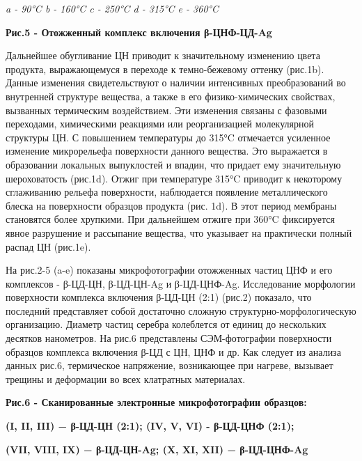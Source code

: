 \emph{a - 90°C b - 160°C c - 250°C d - 315°C e - 360°C}

{\bfseries Рис.5 - Отожженный комплекс включения β-ЦНФ-ЦД-Ag}

Дальнейшее обугливание ЦН приводит к значительному изменению цвета
продукта, выражающемуся в переходе к темно-бежевому оттенку (рис.1b).
Данные изменения свидетельствуют о наличии интенсивных преобразований во
внутренней структуре вещества, а также в его физико-химических
свойствах, вызванных термическим воздействием. Эти изменения связаны с
фазовыми переходами, химическими реакциями или реорганизацией
молекулярной структуры ЦН. С повышением температуры до 315°C отмечается
усиленное изменение микрорельефа поверхности данного вещества. Это
выражается в образовании локальных выпуклостей и впадин, что придает ему
значительную шероховатость (рис.1d). Отжиг при температуре 315°C
приводит к некоторому сглаживанию рельефа поверхности, наблюдается
появление металлического блеска на поверхности образцов продукта (рис.
1d). В этот период мембраны становятся более хрупкими. При дальнейшем
отжиге при 360°C фиксируется явное разрушение и рассыпание вещества, что
указывает на практически полный распад ЦН (рис.1e).

На рис.2-5 (a-e) показаны микрофотографии отожженных частиц ЦНФ и его
комплексов - β-ЦД-ЦН, β-ЦД-ЦН-Ag и β-ЦД-ЦНФ-Ag. Исследование морфологии
поверхности комплекса включения β-ЦД-ЦН (2:1) (рис.2) показало, что
последний представляет собой достаточно сложную
структурно-морфологическую организацию. Диаметр частиц серебра
колеблется от единиц до нескольких десятков нанометров. На рис.6
представлены СЭМ-фотографии поверхности образцов комплекса включения
β-ЦД с ЦН, ЦНФ и др. Как следует из анализа данных рис.6, термическое
напряжение, возникающее при нагреве, вызывает трещины и деформации во
всех клатратных материалах.


{\bfseries Рис.6 - Сканированные электронные микрофотографии образцов:}

{\bfseries (I, II, III) − β-ЦД-ЦН (2:1); (IV, V, VI) - β-ЦД-ЦНФ (2:1);}

{\bfseries (VII, VIII, IX) − β-ЦД-ЦН-Ag; (X, XI, XII) − β-ЦД-ЦНФ-Ag}

